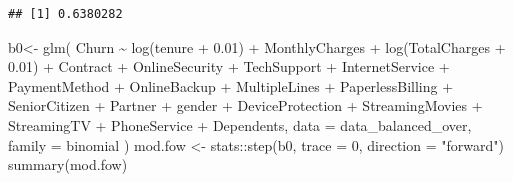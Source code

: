 \documentclass[
  twoside]{article}
\newenvironment{Shaded}{\begin{snugshade}}{\end{snugshade}}
\newcommand{\AttributeTok}[1]{\textcolor[rgb]{0.77,0.63,0.00}{#1}}
\newcommand{\DecValTok}[1]{\textcolor[rgb]{0.00,0.00,0.81}{#1}}
\newcommand{\FloatTok}[1]{\textcolor[rgb]{0.00,0.00,0.81}{#1}}
\newcommand{\FunctionTok}[1]{\textcolor[rgb]{0.00,0.00,0.00}{#1}}
\newcommand{\NormalTok}[1]{#1}
\newcommand{\OtherTok}[1]{\textcolor[rgb]{0.56,0.35,0.01}{#1}}
\newcommand{\SpecialCharTok}[1]{\textcolor[rgb]{0.00,0.00,0.00}{#1}}
\newcommand{\StringTok}[1]{\textcolor[rgb]{0.31,0.60,0.02}{#1}}
\begin{document}
\begin{verbatim}
## [1] 0.6380282
\end{verbatim}

\begin{Shaded}
\begin{Highlighting}[]
\NormalTok{b0}\OtherTok{\textless{}{-}} \FunctionTok{glm}\NormalTok{(}
\NormalTok{  Churn }\SpecialCharTok{\textasciitilde{}} \FunctionTok{log}\NormalTok{(tenure }\SpecialCharTok{+} \FloatTok{0.01}\NormalTok{)}
  \SpecialCharTok{+}\NormalTok{ MonthlyCharges}
  \SpecialCharTok{+} \FunctionTok{log}\NormalTok{(TotalCharges }\SpecialCharTok{+} \FloatTok{0.01}\NormalTok{)}
  \SpecialCharTok{+}\NormalTok{ Contract }\SpecialCharTok{+}\NormalTok{ OnlineSecurity }\SpecialCharTok{+}\NormalTok{ TechSupport }\SpecialCharTok{+}\NormalTok{ InternetService }\SpecialCharTok{+}\NormalTok{ PaymentMethod }
  \SpecialCharTok{+}\NormalTok{ OnlineBackup }\SpecialCharTok{+}\NormalTok{ MultipleLines }\SpecialCharTok{+}\NormalTok{ PaperlessBilling }\SpecialCharTok{+}\NormalTok{ SeniorCitizen }\SpecialCharTok{+}\NormalTok{ Partner }
  \SpecialCharTok{+}\NormalTok{ gender }\SpecialCharTok{+}\NormalTok{ DeviceProtection }\SpecialCharTok{+}\NormalTok{ StreamingMovies }\SpecialCharTok{+}\NormalTok{ StreamingTV }\SpecialCharTok{+}\NormalTok{ PhoneService }
  \SpecialCharTok{+}\NormalTok{ Dependents,}
  \AttributeTok{data =}\NormalTok{ data\_balanced\_over,}
  \AttributeTok{family =}\NormalTok{ binomial}
\NormalTok{)}
\NormalTok{mod.fow }\OtherTok{\textless{}{-}}\NormalTok{ stats}\SpecialCharTok{::}\FunctionTok{step}\NormalTok{(b0, }\AttributeTok{trace =} \DecValTok{0}\NormalTok{, }\AttributeTok{direction =} \StringTok{"forward"}\NormalTok{)}
\FunctionTok{summary}\NormalTok{(mod.fow)}
\end{Highlighting}
\end{Shaded}
\end{document}
